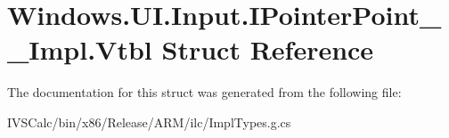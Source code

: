 \hypertarget{struct_windows_1_1_u_i_1_1_input_1_1_i_pointer_point_____impl_1_1_vtbl}{}\section{Windows.\+U\+I.\+Input.\+I\+Pointer\+Point\+\_\+\+\_\+\+Impl.\+Vtbl Struct Reference}
\label{struct_windows_1_1_u_i_1_1_input_1_1_i_pointer_point_____impl_1_1_vtbl}


The documentation for this struct was generated from the following file\+:\begin{DoxyCompactItemize}
\item 
I\+V\+S\+Calc/bin/x86/\+Release/\+A\+R\+M/ilc/Impl\+Types.\+g.\+cs\end{DoxyCompactItemize}
